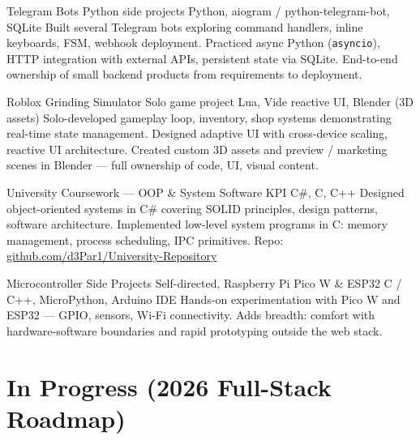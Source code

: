 \documentclass[11pt,a4paper,sans]{moderncv}
\begin{document}
        {Telegram Bots}
        {Python side projects}
        {}
        {Python, aiogram / python-telegram-bot, SQLite}
        {Built several Telegram bots exploring command handlers, inline keyboards, FSM, webhook deployment. Practiced async Python (\texttt{asyncio}), HTTP integration with external APIs, persistent state via SQLite. End-to-end ownership of small backend products from requirements to deployment.}

        {Roblox Grinding Simulator}
        {Solo game project}
        {}
        {Lua, Vide reactive UI, Blender (3D assets)}
        {Solo-developed gameplay loop, inventory, shop systems demonstrating real-time state management. Designed adaptive UI with cross-device scaling, reactive UI architecture. Created custom 3D assets and preview / marketing scenes in Blender — full ownership of code, UI, visual content.}

        {University Coursework — OOP \& System Software}
        {KPI}
        {}
        {C\#, C, C++}
        {Designed object-oriented systems in C\# covering SOLID principles, design patterns, software architecture. Implemented low-level system programs in C: memory management, process scheduling, IPC primitives. Repo: \href{https://github.com/d3Par1/University-Repository}{github.com/d3Par1/University-Repository}}

        {Microcontroller Side Projects}
        {Self-directed, Raspberry Pi Pico W \& ESP32}
        {}
        {C / C++, MicroPython, Arduino IDE}
        {Hands-on experimentation with Pico W and ESP32 — GPIO, sensors, Wi-Fi connectivity. Adds breadth: comfort with hardware-software boundaries and rapid prototyping outside the web stack.}

\section{In Progress (2026 Full-Stack Roadmap)}
\end{document}
